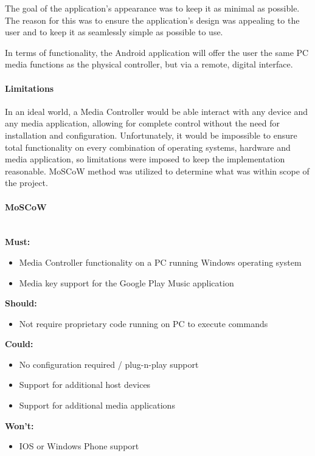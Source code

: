 \documentclass{article}
\begin{document}
				The goal of the application's appearance was to keep it as minimal as possible. The reason for this was to ensure the application's design was appealing to the user and to keep it as seamlessly simple as possible to use.
				
				In terms of functionality, the Android application will offer the user the same PC media functions as the physical controller, but via a remote, digital interface.
							
			\paragraph{Limitations}
				In an ideal world, a Media Controller would be able interact with any device and any media application, allowing for complete control without the need for installation and configuration. Unfortunately, it would be impossible to ensure total functionality on every combination of operating systems, hardware and media application, so limitations were imposed to keep the implementation reasonable. MoSCoW method was utilized to determine what was within scope of the project.

			\begin{minipage}{\textwidth}\label{MoSCoW}
				\paragraph{MoSCoW}
					\noindent\\
					\textbf{Must:}
						\begin{itemize}
							\item Media Controller functionality on a PC running Windows operating system
							\item Media key support for the Google Play Music application
						\end{itemize}			
					\textbf{Should:}
						\begin{itemize}
							\item Not require proprietary code running on PC to execute commands
						\end{itemize}
					\textbf{Could:}
						\begin{itemize}
							\item No configuration required / plug-n-play support
							\item Support for additional host devices
							\item Support for additional media applications
						\end{itemize}
					\textbf{Won't:}
						\begin{itemize}
							\item IOS or Windows Phone support
						\end{itemize}
				\end{minipage}
				
\end{document}
